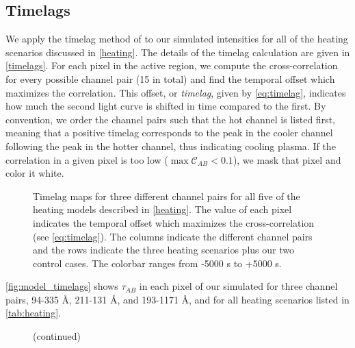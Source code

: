 \subsection{Timelags}

We apply the timelag method of \citet{viall_evidence_2012} to our simulated intensities for all of the heating scenarios discussed in \ref{heating}. The details of the timelag calculation are given in \ref{timelags}. For each pixel in the active region, we compute the cross-correlation for every possible channel pair (15 in total) and find the temporal offset which maximizes the correlation. This offset, or \textit{timelag}, given by \ref{eq:timelag}, indicates how much the second light curve is shifted in time compared to the first. By convention, we order the channel pairs such that the hot channel is listed first, meaning that a positive timelag corresponds to the peak in the cooler channel following the peak in the hotter channel, thus indicating cooling plasma. If the correlation in a given pixel is too low ($\max{\mathcal{C}_{AB}}<0.1$), we mask that pixel and color it white. 

\begin{figure*}[!b]
    \caption{Timelag maps for three different channel pairs for all five of the heating models described in \autoref{heating}. The value of each pixel indicates the temporal offset which maximizes the cross-correlation (see \ref{eq:timelag}). The columns indicate the different channel pairs and the rows indicate the three heating scenarios plus our two control cases. The colorbar ranges from -5000 s to +5000 s.}
    \label{fig:model_timelags}
\end{figure*}

\autoref{fig:model_timelags} shows $\tau_{AB}$ in each pixel of our simulated \AR for three channel pairs, 94-335 \AA, 211-131 \AA, and 193-1171 \AA, and for all heating scenarios listed in \autoref{tab:heating}.

\begin{figure*}[!t]
    \figurenum{\ref*{fig:model_timelags}}
    \caption{(continued)}
\end{figure*}


